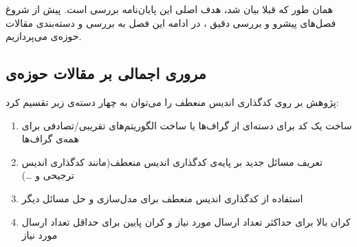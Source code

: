  همان طور که قبلا بیان شد، هدف اصلی این پایان‌نامه بررسی
 \picod
 است. پیش از شروغ فصل‌های پیشرو و بررسی دقیق \picod، در ادامه این فصل به بررسی و دسته‌بندی مقالات حوزه‌ی
  \picod
  می‌پردازیم.
 \subsection{مروری اجمالی بر مقالات حوزه‌ی
 	\picod}
  پژوهش بر روی کدگذاری اندیس منعطف را می‌توان به چهار دسته‌ی زیر تقسیم کرد:
 \begin{enumerate}
 	\item 
 	ساخت یک کد برای دسته‌ای از گراف‌ها یا ساخت الگوریتم‌های تقریبی/تصادفی برای همه‌ی گراف‌ها
 	\item 
 	تعریف مسائل جدید بر پایه‌ی کدگذاری اندیس منعطف(مانند کدگذاری اندیس ترجیحی و \ldots)
 	\item 
 	استفاده از کدگذاری اندیس منعطف برای مدل‌سازی و حل مسائل دیگر
 	\item 
 	کران بالا برای حداکثر تعداد ارسال مورد نیاز و کران پایین برای حداقل تعداد ارسال مورد نیاز
 \end{enumerate}
 
